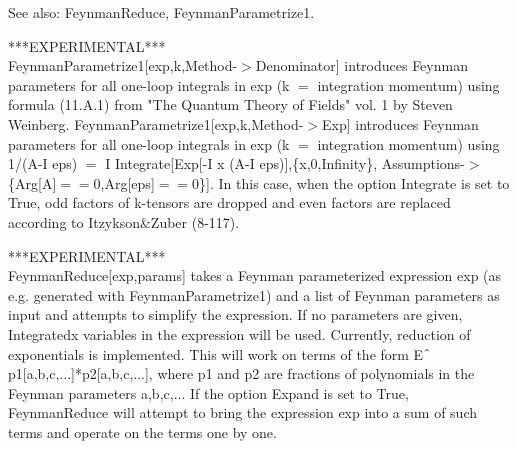 See also:  FeynmanReduce, FeynmanParametrize1.







***EXPERIMENTAL***\\
\hspace*{0.5ex} FeynmanParametrize1[exp,k,Method-\(>\)Denominator] introduces Feynman parameters for all one-loop integrals in exp (k
  \(=\) integration momentum) using formula (11.A.1) from "The Quantum Theory of Fields" vol. 1 by Steven Weinberg. {
  }FeynmanParametrize1[exp,k,Method-\(>\)Exp] introduces Feynman parameters for all one-loop integrals in exp (k \(=\) integration
  momentum) using 1/(A-I eps) \(=\) I Integrate[Exp[-I x (A-I eps)],\{x,0,Infinity\},
  Assumptions-\(>\)\{Arg[A]\(=\)\(=\)0,Arg[eps]\(=\)\(=\)0\}]. In this case, when the option Integrate is set to True, odd factors of
  k-tensors are dropped and even factors are replaced according to Itzykson\&{}Zuber (8-117).







***EXPERIMENTAL***\\
\hspace*{0.5ex} FeynmanReduce[exp,params] takes a Feynman parameterized expression exp (as e.g. generated with FeynmanParametrize1) and a
  list of Feynman parameters as input and attempts to simplify the expression. If no parameters are given, Integratedx variables in the
  expression will be used. Currently, reduction of exponentials is implemented. This will work on terms of the form
  E\(\RawWedge\)p1[a,b,c,...]*p2[a,b,c,...], where p1 and p2 are fractions of polynomials in the Feynman parameters a,b,c,... If the
  option Expand is set to True, FeynmanReduce will attempt to bring the expression exp into a sum of such terms and operate on the terms
  one by one.

